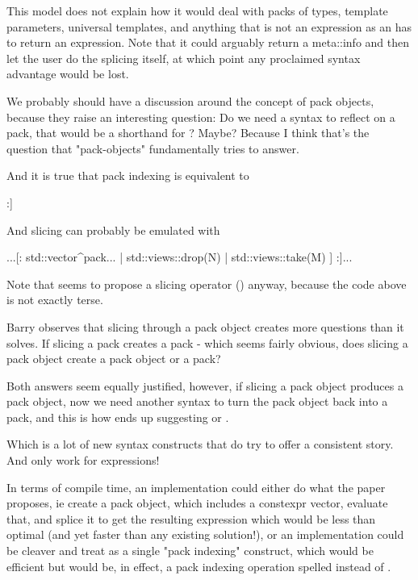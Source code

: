 \documentclass{wg21}
\begin{document}
This model does not explain how it would deal with packs of types, template parameters, universal templates, and anything that is not an expression as an 
has to return an expression.
Note that it could arguably return a meta::info and then let the user do the splicing itself, at which point any proclaimed syntax advantage would be lost.

We probably should have a discussion around the concept of pack objects, because they raise an interesting question:
Do we need a syntax to reflect on a pack, that would be a shorthand for ? Maybe?
Because I think that's the question that "pack-objects" fundamentally tries to answer.

And it is true that pack indexing is equivalent to
\begin{colorblock}
 [: std::vector{^pack...}[N] :]
\end{colorblock}

And slicing can probably be emulated with

\begin{colorblock}
...[: std::vector{^pack...} | std::views::drop(N) | std::views::take(M) ] :]...
\end{colorblock}

Note that  seems to propose a slicing operator () anyway,
because the code above is not exactly terse.

Barry observes that slicing through a pack object creates more questions than it solves.
If slicing a pack creates a pack - which seems fairly obvious, does slicing a pack object create a pack object or a pack?

Both answers seem equally justified, however, if slicing a pack object produces a pack object, now we need another syntax
to turn the pack object back into a pack, and this is how 
ends up suggesting  or .

Which is a lot of new syntax constructs that do try to offer a consistent story.
And only work for expressions!

In terms of compile time, an implementation could either do what the paper proposes,
ie create a pack object, which includes a constexpr vector, evaluate that, and splice it to get the resulting expression
which would be less than optimal (and yet faster than any existing solution!), or an implementation
could be cleaver and treat \tcode{![N]} as a single "pack indexing" construct, which would be efficient but would be, in effect,
a pack indexing operation spelled \tcode{![]} instead of .
\end{document}
